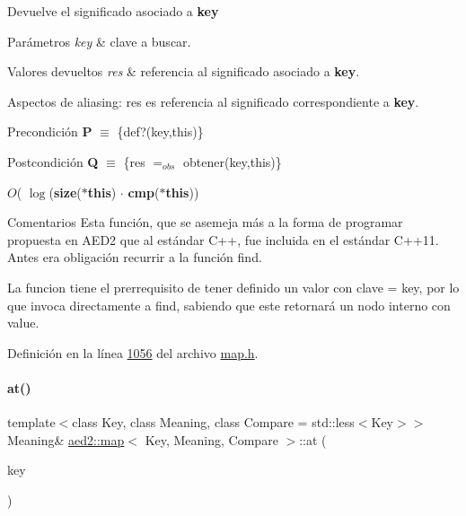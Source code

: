 Devuelve el significado asociado a {\bfseries key} 


\begin{DoxyParams}{Parámetros}
{\em key} & clave a buscar. \\
\hline
\end{DoxyParams}

\begin{DoxyRetVals}{Valores devueltos}
{\em res} & referencia al significado asociado a {\bfseries key}.\\
\hline
\end{DoxyRetVals}
\begin{DoxyParagraph}{Aspectos de aliasing\+:}
res es referencia al significado correspondiente a {\bfseries key}.
\end{DoxyParagraph}
\begin{DoxyPrecond}{Precondición}
{\bfseries P} $\equiv$ \{def?(key,this)\}
\end{DoxyPrecond}
\begin{DoxyPostcond}{Postcondición}
{\bfseries Q} $\equiv$ \{res $=_{obs}$ obtener(key,this)\}
\end{DoxyPostcond}

\begin{DoxyDescription}
\item[Complejidad Temporal]$O$( $\log$({\bfseries size}({\bfseries $\ast$this}) $\cdot$ {\bfseries cmp}({\bfseries $\ast$this}))
\end{DoxyDescription}

\begin{DoxyRemark}{Comentarios}
Esta función, que se asemeja más a la forma de programar propuesta en A\+E\+D2 que al estándar C++, fue incluida en el estándar C++11. Antes era obligación recurrir a la función find.
\end{DoxyRemark}
La funcion tiene el prerrequisito de tener definido un valor con clave = key, por lo que invoca directamente a find, sabiendo que este retornará un nodo interno con value. 

Definición en la línea \hyperlink{map_8h_source_l01056}{1056} del archivo \hyperlink{map_8h_source}{map.\+h}.

\mbox{\label{classaed2_1_1map_a6b21c09f59a83b6ee45432dcfa61f4a1_a6b21c09f59a83b6ee45432dcfa61f4a1}} 
\paragraph{\texorpdfstring{at()}{at()}\hspace{0.1cm}{\footnotesize\ttfamily [2/2]}}
{\footnotesize\ttfamily template$<$class Key, class Meaning, class Compare = std\+::less$<$\+Key$>$$>$ \\
Meaning\& \hyperlink{classaed2_1_1map}{aed2\+::map}$<$ Key, Meaning, Compare $>$\+::at (\begin{DoxyParamCaption}\item[{const Key \&}]{key }\end{DoxyParamCaption})\hspace{0.3cm}{\ttfamily [inline]}}

